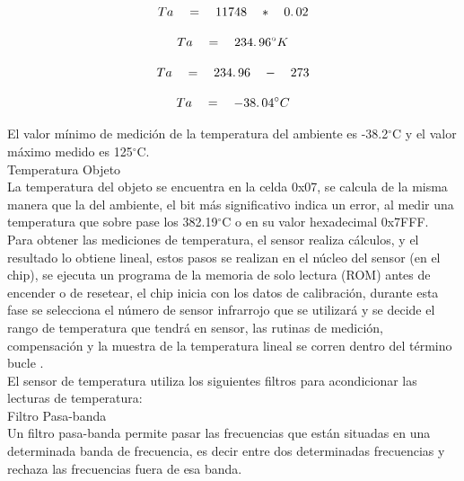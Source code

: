 \begin{equation}
Ta \quad = \quad 11748 \quad \ast \quad 0\ldotp02
\end{equation}

\begin{equation}
Ta \quad = \quad 234\ldotp96^{\circ}K
\end{equation}

\begin{equation}
Ta \quad = \quad 234\ldotp96 \quad - \quad 273
\end{equation}

\begin{equation}
Ta \quad = \quad - 38\ldotp04^{\circ}C
\end{equation}

El valor mínimo de medición de la temperatura del ambiente es -38.2$^{\circ}$C y el valor máximo medido es 125$^{\circ}$C. \\
 
Temperatura Objeto \\

La temperatura del objeto se encuentra en la celda 0x07, se calcula de la misma manera que la del ambiente, el bit más significativo indica un error, al medir una temperatura que sobre pase los 382.19$^{\circ}$C o en su valor hexadecimal 0x7FFF. \\

Para obtener las mediciones de temperatura, el sensor realiza cálculos, y el resultado lo obtiene lineal, estos pasos se realizan en el núcleo del sensor (en el chip), se ejecuta un programa de la memoria de solo lectura (ROM) antes de encender o de resetear, el chip inicia con los datos de calibración, durante esta fase se selecciona el número de sensor infrarrojo que se utilizará y se decide el rango de temperatura que tendrá en sensor, las rutinas de medición, compensación y la muestra de la  temperatura lineal se corren dentro del término bucle \cite{cuarentaycinco}. \\

El sensor de temperatura utiliza los siguientes filtros para acondicionar las lecturas de temperatura: \\

Filtro Pasa-banda \\

Un filtro pasa-banda permite pasar las frecuencias que están situadas en una determinada banda de frecuencia, es decir entre dos determinadas frecuencias y rechaza las frecuencias fuera de esa banda. \\

